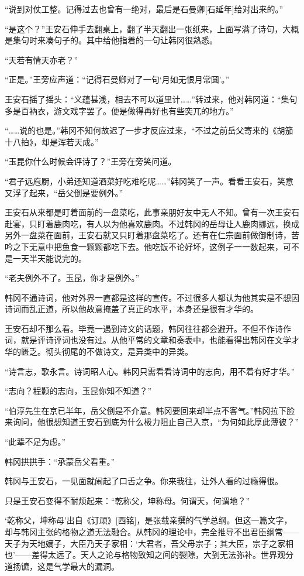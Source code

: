 “说到对仗工整。记得过去也曾有一绝对，最后是石曼卿[石延年]给对出来的。”

“是这个？”王安石伸手去翻桌上，翻了半天翻出一张纸来，上面写满了诗句，大概是集句时来凑句子的。其中给他指着的一句让韩冈很熟悉。

“天若有情天亦老？”

“正是。”王旁应声道：“记得石曼卿对了一句‘月如无恨月常圆’。”

王安石摇了摇头：“义蕴甚浅，相去不可以道里计……”转过来，他对韩冈道：“集句多是百衲衣，游文戏字罢了。便是做得再好也有些突兀的地方。”

“……说的也是。”韩冈不知何故迟了一步才反应过来，“不过之前岳父寄来的《胡笳十八拍》，却是浑若天成。”

“玉昆你什么时候会评诗了？”王旁在旁笑问道。

“君子远庖厨，小弟还知道酒菜好吃难吃呢……”韩冈笑了一声。看看王安石，笑意又浮了起来，“岳父倒是要例外。”

王安石从来都是盯着面前的一盘菜吃，此事亲朋好友中无人不知。曾有一次王安石赴宴，只盯着鹿肉吃，有人以为他喜欢鹿肉。不过韩冈的岳母让人鹿肉挪远，换成另外一盘菜在面前，王安石就又只盯着那盘菜吃了。还有在仁宗面前做御制诗，苦吟之下无意中把鱼食一颗颗都吃下去。他吃饭不论好坏，这例子一一数起来，可不是一天半天能说完的。

“老夫例外不了。玉昆，你才是例外。”

韩冈不通诗词，他对外界一直都是这样的宣传。不过很多人都认为他其实是不想因诗词而乱正道，所以他故意掩盖了真正的水平，本身还是很有才华的。

王安石却不那么看。毕竟一遇到诗文的话题，韩冈往往都会避开。不但不作诗作词，就是评诗评词也没有过。从他平常的文章和奏表中，也能看得出韩冈在文学才华的匮乏。彻头彻尾的不做诗文，是异类中的异类。

“诗言志，歌永言。诗词昭人心。韩冈只需看看诗词中的志向，用不着有好才华。”

“志向？程颢的志向，玉昆你知不知道？”

“伯淳先生在京已半年，岳父倒是不介意。韩冈要回来却半点不客气。”韩冈拉下脸来询问，他很想知道王安石到底为什么极力阻止自己入京，“为何如此厚此薄彼？”

“此辈不足为虑。”

韩冈拱拱手：“承蒙岳父看重。”

韩冈与王安石，一见面就闹起了口舌之争。你来我往，让外人看的过瘾得很。

只是王安石变得不耐烦起来：“乾称父，坤称母。何谓天，何谓地？”

‘乾称父，坤称母’出自《订顽》[西铭]，是张载亲撰的气学总纲。但这一篇文字，却与韩冈主张的格物之道无法融合。从韩冈的理论中，完全推导不出君臣纲常——天子为天地嫡子，大臣乃天子家相：‘大君者，吾父母宗子；其大臣，宗子之家相也’——差得太远了。天人之论与格物致知之间的裂隙，大到无法弥补。世界观分道扬镳，这是气学最大的漏洞。

